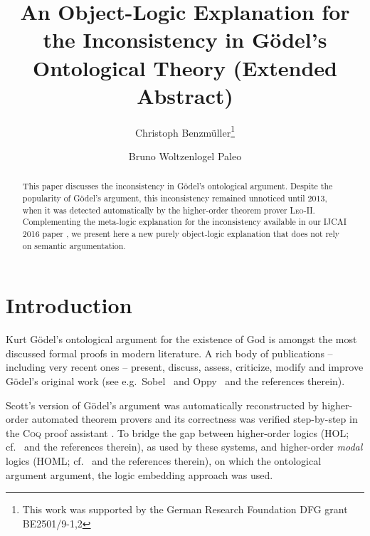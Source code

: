 \documentclass{llncs}
\begin{document}
\title{An Object-Logic Explanation for the Inconsistency in G\"odel's
  Ontological Theory (Extended Abstract)}
\author{Christoph Benzm\"uller\thanks{This work was supported by
    the German Research Foundation DFG grant BE2501/9-1,2} \and Bruno Woltzenlogel Paleo 
}


\maketitle            



\begin{abstract}
  This paper discusses the 
  inconsistency in G\"odel's
  ontological argument. Despite the popularity of G\"odel's argument, this
  inconsistency remained unnoticed until 2013, 
  when it was detected automatically by the 
  higher-order theorem prover \textsc{Leo-II}. Complementing the meta-logic explanation for the inconsistency available in our IJCAI 2016 paper \cite{C55}, we present here a new purely object-logic explanation that does not rely on semantic argumentation.
  
\end{abstract}



\section{Introduction}\label{sec:introduction}
Kurt G\"{o}del's ontological
argument for the existence of God \cite{GoedelNotes,ScottNotes} is
amongst the most discussed formal proofs in modern literature. A rich
body of publications -- including very recent ones -- present,
discuss, assess, criticize, modify and improve G\"{o}del's original
work (see e.g.~Sobel~\cite{sobel2004logic} and Oppy~\cite{sep-ontological-arguments} and the
references therein). 

Scott's version of G\"odel's argument was automatically reconstructed
by higher-order automated theorem provers \cite{C40} and its
correctness was verified step-by-step in the \textsc{Coq} proof
assistant \cite{CSR}. To bridge the gap between higher-order logics
(HOL; cf.~\cite{andrewsSEP} and the references therein), as used by
these systems, and higher-order \emph{modal} logics (HOML;
cf.~\cite{homl} and the references therein), on which the ontological
argument argument, the logic embedding approach \cite{J23,C40} was
used.
\end{document}
